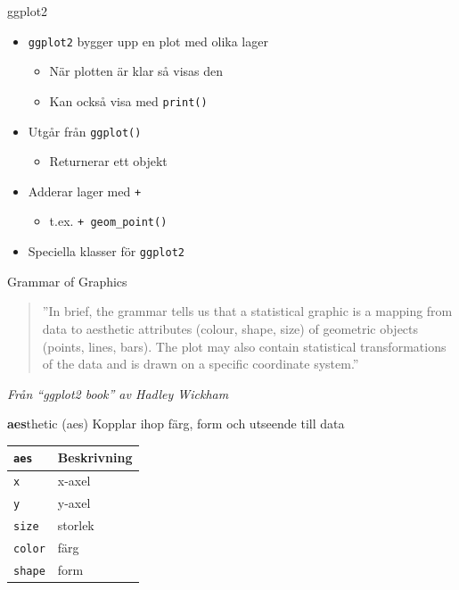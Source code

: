 \documentclass[
  11pt,
  ignorenonframetext,
  handout]{beamer}
\providecommand{\tightlist}{%
  \setlength{\itemsep}{0pt}\setlength{\parskip}{0pt}}
\begin{document}
\begin{frame}{ggplot2}
\protect\hypertarget{ggplot2-4}{}
\begin{itemize}
\tightlist
\item
  \texttt{ggplot2} bygger upp en plot med olika lager

  \begin{itemize}
  \tightlist
  \item
    När plotten är klar så visas den
  \item
    Kan också visa med \texttt{print()}
  \end{itemize}
\item
  Utgår från \texttt{ggplot()}

  \begin{itemize}
  \tightlist
  \item
    Returnerar ett objekt
  \end{itemize}
\item
  Adderar lager med \texttt{+}

  \begin{itemize}
  \tightlist
  \item
    t.ex. \texttt{+ geom\_point()}
  \end{itemize}
\item
  Speciella klasser för \texttt{ggplot2}
\end{itemize}
\end{frame}

\begin{frame}{Grammar of Graphics}
\protect\hypertarget{grammar-of-graphics-1}{}
\begin{quote}
''In brief, the grammar tells us that a statistical graphic is a mapping
from data to aesthetic attributes (colour, shape, size) of geometric
objects (points, lines, bars). The plot may also contain statistical
transformations of the data and is drawn on a specific coordinate
system.''
\end{quote}

\emph{Från ``ggplot2 book'' av Hadley Wickham}
\end{frame}

\begin{frame}[fragile]{\textbf{aes}thetic (aes)}
\protect\hypertarget{aesthetic-aes}{}
Kopplar ihop färg, form och utseende till data

\begin{longtable}[]{@{}ll@{}}
\toprule
\texttt{aes} & Beskrivning \\
\midrule
\endhead
\texttt{x} & x-axel \\
\texttt{y} & y-axel \\
\texttt{size} & storlek \\
\texttt{color} & färg \\
\texttt{shape} & form \\
\bottomrule
\end{longtable}
\end{frame}
\end{document}
